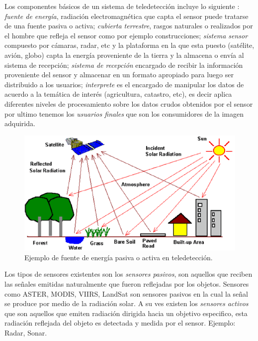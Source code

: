 Los componentes básicos de un sistema de teledetección incluye lo siguiente \citep{chuvieco}: \textit{fuente de energía},  radiación electromagnética que capta el sensor puede tratarse de una fuente pasiva o activa; \textit{cubierta terrestre}, rasgos naturales o 
realizados por el hombre que refleja el sensor como por ejemplo construcciones; \textit{sistema sensor} compuesto por cámaras, radar, etc  y la plataforma en la que esta puesto (satélite, avión, globo) capta la energía proveniente de la tierra y la almacena o envía al sistema de recepción; \textit{sistema de recepción} encargado de recibir la información proveniente del sensor y almacenar en un formato apropiado para luego ser distribuido a los usuarios; \textit{interprete} es el encargado de manipular los datos de acuerdo a la temática de interés (agricultura, catastro, etc), es decir aplica diferentes niveles de procesamiento sobre los datos crudos obtenidos por el sensor por ultimo tenemos los \textit{usuarios finales} que son los consumidores de la imagen adquirida.

\begin{figure}[H] \centering
  \includegraphics[scale=0.35, keepaspectratio=true,clip=true]{imagenes/MarcoTeorico/teledeteccion.png}
  \caption{Ejemplo de fuente de energía pasiva o activa en teledetección.}\label{Fig:teledeteccion}
\end{figure}

Los tipos de sensores existentes son los  \textit{sensores pasivos}, son aquellos que reciben las señales emitidas naturalmente que fueron reflejadas por los objetos. Sensores como ASTER, MODIS, VIIRS, LandSat son sensores pasivos en la cual la señal se produce por medio de la radiación solar. A su ves existen los \textit{sensores activos} que son aquellos que emiten radiación dirigida hacia un objetivo especifico, esta radiación reflejada del objeto es detectada y medida por el sensor. Ejemplo: Radar, Sonar.

